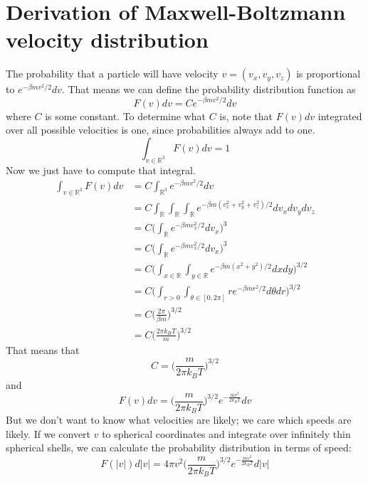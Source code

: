 \documentclass[12pt]{article}
\begin{document}
\section{Derivation of Maxwell-Boltzmann velocity distribution}
The probability that a particle will have velocity $v = (v_x, v_y, v_z)$ is proportional to $e^{- \beta m v^2 / 2} dv$. That means we can define the probability distribution function as
\[F(v) dv = C e^{- \beta m v^2 / 2} dv\]
where $C$ is some constant. To determine what $C$ is, note that $F(v) dv$ integrated over all possible velocities is one, since probabilities always add to one.
\[\int_{v \in \mathbb{R}^3} F(v) dv = 1 \]
Now we just have to compute that integral.
\begin{align*}
    \int_{v \in \mathbb{R}^3} F(v) dv &= C \int_{\mathbb{R}^3} e^{- \beta m v^2 / 2} dv \\
    &= C \int_{\mathbb{R}} \int_{\mathbb{R}} \int_{\mathbb{R}} e^{- \beta m (v_x^2 + v_y^2 + v_z^2) / 2} dv_x dv_y dv_z \\
    &= C \Bigg( \int_{\mathbb{R}} e^{- \beta m v_x^2 / 2} dv_x \Bigg)^3 \\
    &= C \Bigg( \int_{\mathbb{R}} e^{- \beta m v_x^2 / 2} dv_x \Bigg)^3 \\
    &= C \Bigg( \int_{x \in \mathbb{R}} \int_{y \in \mathbb{R}} e^{- \beta m (x^2 + y^2) / 2} dx dy \Bigg)^{3/2} \\
    &= C \Bigg( \int_{r>0} \int_{\theta \in [0, 2\pi]} r e^{- \beta m r^2 / 2} d\theta dr \Bigg)^{3/2} \\
    &= C \Big( \frac{2 \pi}{\beta m} \Big)^{3/2} \\
    &= C \Big( \frac{2 \pi k_B T}{m} \Big)^{3/2}
\end{align*}
That means that
\[C = \Big( \frac{m}{2 \pi k_B T} \Big)^{3/2}\]
and
\[F(v) dv = \Big( \frac{m}{2 \pi k_B T} \Big)^{3/2} e^{-\frac{m v^2}{2 k_B T}} dv\]
But we don't want to know what velocities are likely; we care which speeds are likely. If we convert $v$ to spherical coordinates and integrate over infinitely thin spherical shells, we can calculate the probability distribution in terms of speed:
\[F(|v|) d|v| = 4 \pi v^2 \Big( \frac{m}{2 \pi k_B T} \Big)^{3/2} e^{-\frac{m v^2}{2 k_B T}} d|v|\]
\end{document}
